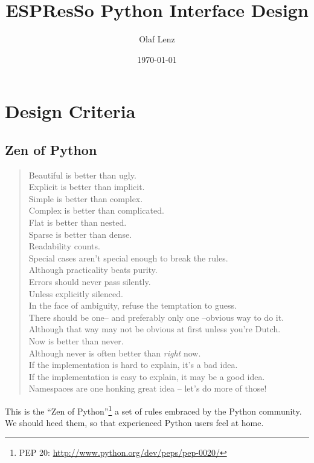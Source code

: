 \documentclass[
a4paper,                        %
11pt,                           %
]{scrartcl}
\newcommand{\es}{\mbox{\textsf{ESPResSo}}\xspace}
\begin{document}
\title{\es Python Interface Design}
\author{Olaf Lenz}
\date{\today}
\maketitle

\tableofcontents

\clearpage
\section{Design Criteria}

\subsection{Zen of Python}

\begin{verse}
Beautiful is better than ugly.\\
Explicit is better than implicit.\\
Simple is better than complex.\\
Complex is better than complicated.\\
Flat is better than nested.\\
Sparse is better than dense.\\
Readability counts.\\
Special cases aren't special enough to break the rules.\\
Although practicality beats purity.\\
Errors should never pass silently.\\
Unless explicitly silenced.\\
In the face of ambiguity, refuse the temptation to guess.\\
There should be one-- and preferably only one --obvious way to do it.\\
Although that way may not be obvious at first unless you're Dutch.\\
Now is better than never.\\
Although never is often better than \emph{right} now.\\
If the implementation is hard to explain, it's a bad idea.\\
If the implementation is easy to explain, it may be a good idea.\\
Namespaces are one honking great idea -- let's do more of those!
\end{verse}

This is the ``Zen of Python''\footnote{PEP 20:
  \url{http://www.python.org/dev/peps/pep-0020/}} a set of rules
embraced by the Python community.  We should heed them, so that
experienced Python users feel at home.
\end{document}
